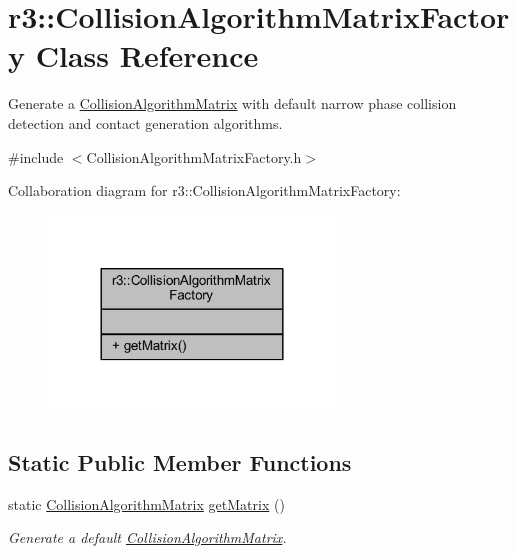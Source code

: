 \hypertarget{classr3_1_1_collision_algorithm_matrix_factory}{}\section{r3\+:\+:Collision\+Algorithm\+Matrix\+Factory Class Reference}
\label{classr3_1_1_collision_algorithm_matrix_factory}


Generate a \mbox{\hyperlink{classr3_1_1_collision_algorithm_matrix}{Collision\+Algorithm\+Matrix}} with default narrow phase collision detection and contact generation algorithms.  




{\ttfamily \#include $<$Collision\+Algorithm\+Matrix\+Factory.\+h$>$}



Collaboration diagram for r3\+:\+:Collision\+Algorithm\+Matrix\+Factory\+:\nopagebreak
\begin{figure}[H]
\begin{center}
\leavevmode
\includegraphics[width=216pt]{classr3_1_1_collision_algorithm_matrix_factory__coll__graph}
\end{center}
\end{figure}
\subsection*{Static Public Member Functions}
\begin{DoxyCompactItemize}
\item 
static \mbox{\hyperlink{classr3_1_1_collision_algorithm_matrix}{Collision\+Algorithm\+Matrix}} \mbox{\hyperlink{classr3_1_1_collision_algorithm_matrix_factory_a236c7063f66f29284fb1c008c402b043}{get\+Matrix}} ()
\begin{DoxyCompactList}\small\item\em Generate a default \mbox{\hyperlink{classr3_1_1_collision_algorithm_matrix}{Collision\+Algorithm\+Matrix}}. \end{DoxyCompactList}\end{DoxyCompactItemize}


